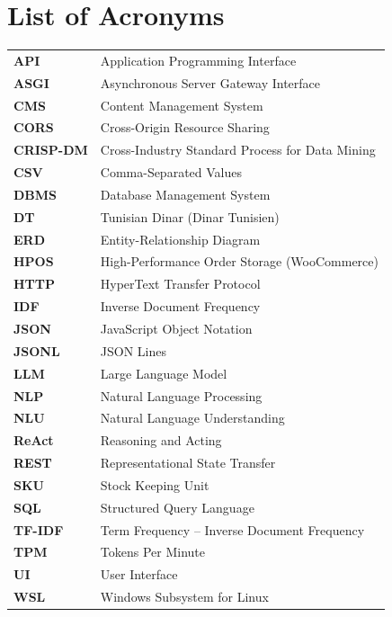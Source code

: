 ﻿%
\clearpage
{}
{}
\chapter*{List of Acronyms}

\begin{longtable}{L{3.0cm} L{11.5cm}}
\textbf{API}       & Application Programming Interface \\
\textbf{ASGI}      & Asynchronous Server Gateway Interface \\
\textbf{CMS}       & Content Management System \\
\textbf{CORS}      & Cross-Origin Resource Sharing \\
\textbf{CRISP-DM}  & Cross-Industry Standard Process for Data Mining \\
\textbf{CSV}       & Comma-Separated Values \\
\textbf{DBMS}      & Database Management System \\
\textbf{DT}        & Tunisian Dinar (Dinar Tunisien) \\
\textbf{ERD}       & Entity-Relationship Diagram \\
\textbf{HPOS}      & High-Performance Order Storage (WooCommerce) \\
\textbf{HTTP}      & HyperText Transfer Protocol \\
\textbf{IDF}       & Inverse Document Frequency \\
\textbf{JSON}      & JavaScript Object Notation \\
\textbf{JSONL}     & JSON Lines \\
\textbf{LLM}       & Large Language Model \\
\textbf{NLP}       & Natural Language Processing \\
\textbf{NLU}       & Natural Language Understanding \\
\textbf{ReAct}     & Reasoning and Acting \\
\textbf{REST}      & Representational State Transfer \\
\textbf{SKU}       & Stock Keeping Unit \\
\textbf{SQL}       & Structured Query Language \\
\textbf{TF-IDF}    & Term Frequency -- Inverse Document Frequency \\
\textbf{TPM}       & Tokens Per Minute \\
\textbf{UI}        & User Interface \\
\textbf{WSL}       & Windows Subsystem for Linux \\
\end{longtable}

\clearpage
